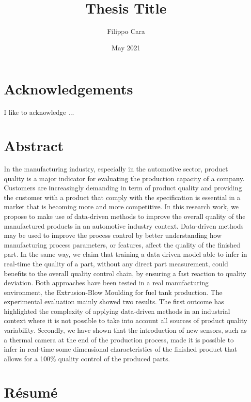 \documentclass[twoside,12pt,a4paper]{book}
\title{Thesis Title}
\author{Filippo Cara}
\date{May 2021}
\begin{document}
\maketitle

\dominitoc

\chapter*{Acknowledgements}

I like to acknowledge ...

\chapter*{Abstract}

In the manufacturing industry, especially in the automotive sector, product quality is a major indicator for evaluating the production capacity of a company. Customers are increasingly demanding in term of product quality and providing the customer with a product that comply with the specification is essential in a market that is becoming more and more competitive. In this research work, we propose to make use of data-driven methods to improve the overall quality of the manufactured products in an automotive industry context. Data-driven methods may be used to improve the process control by better understanding how manufacturing process parameters, or features,  affect the quality of the finished part. In the same way, we claim that training a data-driven model able to infer in real-time the quality of a part, without any direct part measurement, could benefits to the overall quality control chain, by ensuring a fast reaction to quality deviation. Both approaches have been tested in a real manufacturing environment, the Extrusion-Blow Moulding for fuel tank production. The experimental evaluation mainly showed two results. The first outcome has highlighted the complexity of applying data-driven methods in an industrial context where it is not possible to take into account all sources of product quality variability. Secondly, we have shown that the introduction of new sensors, such as a thermal camera at the end of the production process, made it is possible to infer in real-time some dimensional characteristics of the finished product that allows for a 100\% quality control of the produced parts.       

  
\chapter*{Résumé}
\end{document}
